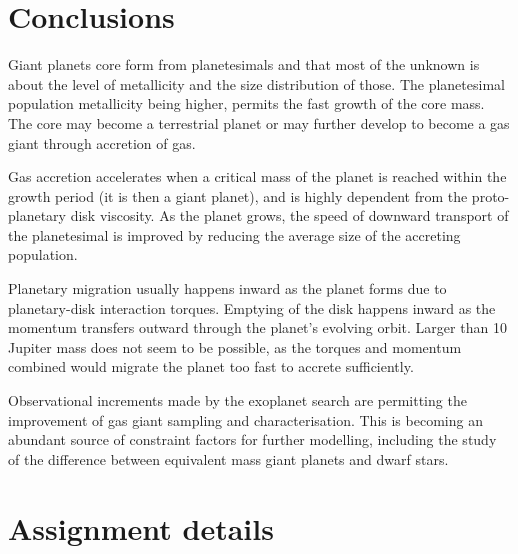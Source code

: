 \documentclass[12pt]{article} %
\begin{document}
\section{Conclusions}\vspace{-2ex}\titlerule[1pt]\bigskip

Giant planets core form from planetesimals and that most of the unknown is about the level of metallicity and the size distribution of those. The planetesimal population metallicity being higher, permits the fast growth of the core mass. The core may become a terrestrial planet or may further develop to become a gas giant through accretion of gas.\newline

\noindent Gas accretion accelerates when a critical mass of the planet is reached within the growth period (it is then a giant planet), and is highly dependent from the proto-planetary disk viscosity. As the planet grows, the speed of downward transport of the planetesimal is improved by reducing the average size of the accreting population.\newline

\noindent Planetary migration usually happens inward as the planet forms due to planetary-disk interaction torques. Emptying of the disk happens inward as the momentum transfers outward through the planet's evolving orbit. Larger than 10 Jupiter mass does not seem to be possible, as the torques and momentum combined would migrate the planet too fast to accrete sufficiently.\newline

\noindent Observational increments made by the exoplanet search are permitting the improvement of gas giant sampling and characterisation. This is becoming an abundant source of constraint factors for further modelling, including the study of the difference between equivalent mass giant planets and dwarf stars.\newline



\section{Assignment details}\vspace{-2ex}\titlerule[1pt]\bigskip
\end{document}

